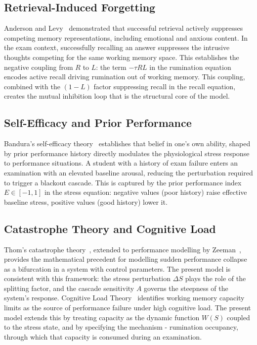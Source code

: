 \subsection{Retrieval-Induced Forgetting}

Anderson and Levy~\cite{anderson2003} demonstrated that successful
retrieval actively suppresses competing memory representations,
including emotional and anxious content. In the exam context,
successfully recalling an answer suppresses the intrusive thoughts
competing for the same working memory space. This establishes the
negative coupling from $R$ to $L$: the term $-\tau RL$ in the
rumination equation encodes active recall driving rumination
out of working memory. This coupling, combined with the $(1-L)$
factor suppressing recall in the recall equation, creates the
mutual inhibition loop that is the structural core of the model.

\subsection{Self-Efficacy and Prior Performance}

Bandura's self-efficacy theory~\cite{bandura1977} establishes that
belief in one's own ability, shaped by prior performance
history directly modulates the physiological stress response to
performance situations. A student with a history of exam failure
enters an examination with an elevated baseline arousal, reducing
the perturbation required to trigger a blackout cascade. This is
captured by the prior performance index $E\in[-1,1]$ in the stress
equation: negative values (poor history) raise effective baseline
stress, positive values (good history) lower it.

\subsection{Catastrophe Theory and Cognitive Load}

Thom's catastrophe theory~\cite{thom1975}, extended to performance
modelling by Zeeman~\cite{zeeman1976}, provides the mathematical
precedent for modelling sudden performance collapse as a
bifurcation in a system with control parameters. The present model
is consistent with this framework: the stress perturbation
$\Delta S$ plays the role of the splitting factor, and the cascade
sensitivity $A$ governs the steepness of the system's response.
Cognitive Load Theory~\cite{sweller1988} identifies working memory
capacity limits as the source of performance failure under high
cognitive load. The present model extends this by treating capacity
as the dynamic function $W(S)$ coupled to the stress state, and
by specifying the mechanism - rumination occupancy, through which
that capacity is consumed during an examination.

